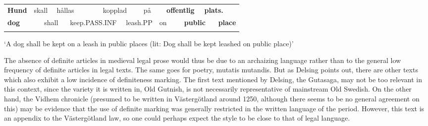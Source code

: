 \begin{tabular}{llllllllllllll}
\lsptoprule
{\bfseries Hund} & \multicolumn{2}{l}{skall

} & \multicolumn{2}{l}{hållas

} & \multicolumn{2}{l}{kopplad

} & \multicolumn{2}{l}{på

} & \multicolumn{2}{l}{{\bfseries offentlig}

} & \multicolumn{2}{l}{{\bfseries plats.}

} & \\
\multicolumn{2}{l}{{\bfseries dog}

} & \multicolumn{2}{l}{shall

} & \multicolumn{2}{l}{keep.PASS.INF

} & \multicolumn{2}{l}{leash.PP

} & \multicolumn{2}{l}{on

} & \multicolumn{2}{l}{{\bfseries public}

} & \multicolumn{2}{l}{{\bfseries place}

}\\
\lspbottomrule
\end{tabular}

\begin{styleTranslation}
‘A dog shall be kept on a leash in public places (lit: Dog shall be kept leashed on public place)’

\end{styleTranslation}

\begin{styleBodyTextFirst}
The absence of definite articles in medieval legal prose would thus be due to an archaizing language rather than to the general low frequency of definite articles in legal texts. The same goes for poetry, mutatis mutandis. But as Delsing points out, there are other texts which also exhibit a low incidence of definiteness marking. The first text mentioned by Delsing, the Gutasaga, may not be too relevant in this context, since the variety it is written in, Old Gutnish, is not necessarily representative of mainstream Old Swedish.  On the other hand, the Vidhem chronicle (presumed to be written in Västergötland around 1250, although there seems to be no general agreement on this) may be evidence that the use of definite marking was generally restricted in the written language of the period. However, this text is an appendix to the Västergötland law, so one could perhaps expect the style to be close to that of legal language. 

\end{styleBodyTextFirst}

